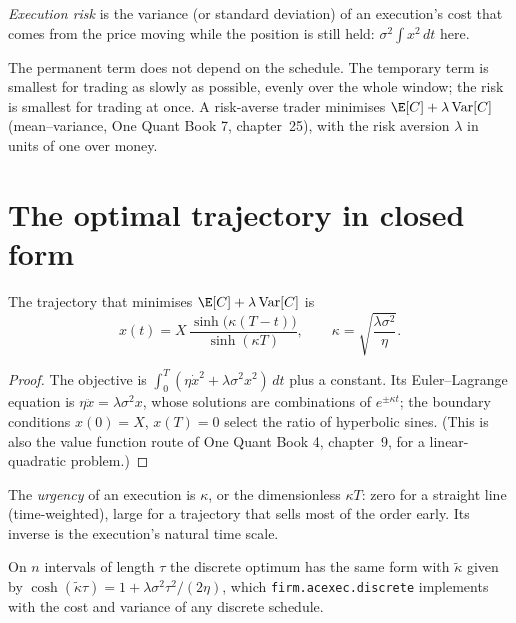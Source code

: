 \begin{definition}\label{def:mx:the-almgren-chriss-framework:risk}
\emph{Execution risk} is the variance (or standard deviation) of an execution's cost that comes from the price moving while the
position is still held: $\sigma^2\int x^2\,dt$ here.
\end{definition}

The permanent term does not depend on the schedule. The temporary term is smallest for trading as slowly as possible, evenly over the whole window; the
risk is smallest for trading at once. A risk-averse trader minimises $\E[C]+\lambda\operatorname{Var}[C]$ (mean--variance, One Quant Book 7, chapter~25),
with the risk aversion $\lambda$ in units of one over money.

\section{The optimal trajectory in closed form}

\begin{proposition}\label{prop:mx:the-almgren-chriss-framework:sinh}
The trajectory that minimises $\E[C]+\lambda\operatorname{Var}[C]$ is
\[
x(t)=X\,\frac{\sinh\bigl(\kappa(T-t)\bigr)}{\sinh(\kappa T)},\qquad \kappa=\sqrt{\frac{\lambda\sigma^2}{\eta}}.
\]
\end{proposition}

\begin{proof}
The objective is $\int_0^T(\eta\dot x^2+\lambda\sigma^2x^2)\,dt$ plus a constant. Its Euler--Lagrange equation is $\eta\ddot x=\lambda\sigma^2x$, whose
solutions are combinations of $e^{\pm\kappa t}$; the boundary conditions $x(0)=X$, $x(T)=0$ select the ratio of hyperbolic sines. (This is also the value
function route of One Quant Book 4, chapter~9, for a linear-quadratic problem.)
\end{proof}

\begin{definition}[Urgency]\label{def:mx:the-almgren-chriss-framework:urgency}
The \emph{urgency} of an execution is $\kappa$, or the dimensionless $\kappa T$: zero for a straight line (time-weighted), large for a
trajectory that sells most of the order early. Its inverse is the execution's natural time scale.
\end{definition}

On $n$ intervals of length $\tau$ the discrete optimum has the same form with $\tilde\kappa$ given by $\cosh(\tilde\kappa\tau)=1+\lambda\sigma^2\tau^2/(2\eta)$,
which \texttt{firm.acexec.discrete} implements with the cost and variance of any discrete schedule.


